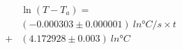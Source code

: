 \begin{equation}
\begin{split}
&\ln(T-T_a) = \\
&(-0.000303\pm 0.000001)\ \si{ln\degree C/s} \times t
\\ + &(4.172928\pm 0.003)\ \si{ln\degree C}
\end{split}
\end{equation}
